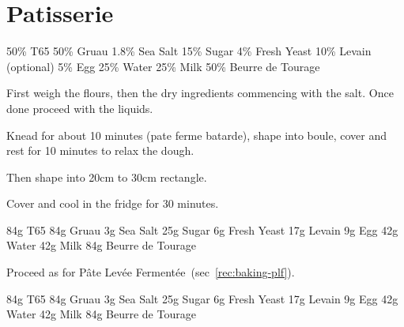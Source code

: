 \chapter{Patisserie}
\minitoc

\label{rec:baking-plf}

\begin{ingreds}
	50\% T65
	50\% Gruau
	1.8\% Sea Salt
	15\% Sugar
	4\% Fresh Yeast
	10\% Levain (optional)
	5\% Egg
	25\% Water
	25\% Milk
	50\% Beurre de Tourage
\end{ingreds}

\begin{method}[]

First weigh the flours, then the dry ingredients commencing with the salt.
Once done proceed with the liquids.

Knead for about 10 minutes (pate ferme batarde), shape into boule, cover and 
rest for 10 minutes to relax the dough.

Then shape into 20cm to 30cm rectangle.

Cover and cool in the fridge for 30 minutes.
\end {method}

\label{rec:baking-crossiant}

\begin{ingreds}
	84g T65
	84g Gruau
	3g Sea Salt
	25g Sugar
	6g Fresh Yeast
	17g Levain
	9g Egg
	42g Water
	42g Milk
	84g Beurre de Tourage
\end{ingreds}

\begin{method}[]
Proceed as for P\^ate Lev\'ee Ferment\'ee~(sec~\ref{rec:baking-plf}).

\end {method}

\label{rec:baking-pain-au-chocolat}

\begin{ingreds}
	84g T65
	84g Gruau
	3g Sea Salt
	25g Sugar
	6g Fresh Yeast
	17g Levain
	9g Egg
	42g Water
	42g Milk
	84g Beurre de Tourage
\end{ingreds}

